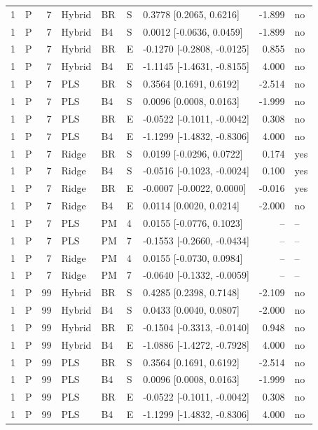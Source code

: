\documentclass[10pt,a4paper]{article}
\begin{document}
\begin{longtable}{rlrllllrl}
1 & P & 7 & Hybrid & BR & S & 0.3778 [0.2065, 0.6216] & -1.899 & no \\
1 & P & 7 & Hybrid & B4 & S & 0.0012 [-0.0636, 0.0459] & -1.899 & no \\
1 & P & 7 & Hybrid & BR & E & -0.1270 [-0.2808, -0.0125] & 0.855 & no \\
1 & P & 7 & Hybrid & B4 & E & -1.1145 [-1.4631, -0.8155] & 4.000 & no \\
1 & P & 7 & PLS & BR & S & 0.3564 [0.1691, 0.6192] & -2.514 & no \\
1 & P & 7 & PLS & B4 & S & 0.0096 [0.0008, 0.0163] & -1.999 & no \\
1 & P & 7 & PLS & BR & E & -0.0522 [-0.1011, -0.0042] & 0.308 & no \\
1 & P & 7 & PLS & B4 & E & -1.1299 [-1.4832, -0.8306] & 4.000 & no \\
1 & P & 7 & Ridge & BR & S & 0.0199 [-0.0296, 0.0722] & 0.174 & yes \\
1 & P & 7 & Ridge & B4 & S & -0.0516 [-0.1023, -0.0024] & 0.100 & yes \\
1 & P & 7 & Ridge & BR & E & -0.0007 [-0.0022, 0.0000] & -0.016 & yes \\
1 & P & 7 & Ridge & B4 & E & 0.0114 [0.0020, 0.0214] & -2.000 & no \\
1 & P & 7 & PLS & PM & 4 & 0.0155 [-0.0776, 0.1023] & -- & -- \\
1 & P & 7 & PLS & PM & 7 & -0.1553 [-0.2660, -0.0434] & -- & -- \\
1 & P & 7 & Ridge & PM & 4 & 0.0155 [-0.0730, 0.0984] & -- & -- \\
1 & P & 7 & Ridge & PM & 7 & -0.0640 [-0.1332, -0.0059] & -- & -- \\
1 & P & 99 & Hybrid & BR & S & 0.4285 [0.2398, 0.7148] & -2.109 & no \\
1 & P & 99 & Hybrid & B4 & S & 0.0433 [0.0040, 0.0807] & -2.000 & no \\
1 & P & 99 & Hybrid & BR & E & -0.1504 [-0.3313, -0.0140] & 0.948 & no \\
1 & P & 99 & Hybrid & B4 & E & -1.0886 [-1.4272, -0.7928] & 4.000 & no \\
1 & P & 99 & PLS & BR & S & 0.3564 [0.1691, 0.6192] & -2.514 & no \\
1 & P & 99 & PLS & B4 & S & 0.0096 [0.0008, 0.0163] & -1.999 & no \\
1 & P & 99 & PLS & BR & E & -0.0522 [-0.1011, -0.0042] & 0.308 & no \\
1 & P & 99 & PLS & B4 & E & -1.1299 [-1.4832, -0.8306] & 4.000 & no \\

\end{longtable}
\end{document}
